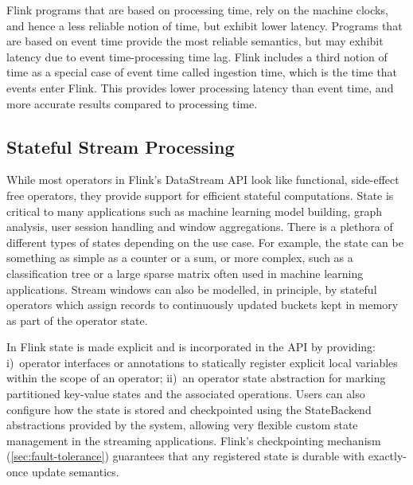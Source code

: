 Flink programs that are based on processing time, rely on the machine clocks, and hence a less reliable notion of time, but exhibit lower latency. Programs that are based on event time provide the most reliable semantics, but may exhibit latency due to event time-processing time lag. Flink includes a third notion of time as a special case of event time called ingestion time, which is the time that events enter Flink. This provides  lower processing latency than event time, and more accurate results compared to processing time.


\subsection{Stateful Stream Processing}
While most operators in Flink’s DataStream API look like functional, side-effect free operators, they provide support for efficient stateful computations. State is critical to many applications such as machine learning model building, graph analysis, user session handling and window aggregations. There is a plethora of different types of states depending on the use case. For example, the state can be something as simple as a counter or a sum, or more complex, such as a classification tree or a large sparse matrix often used in machine learning applications. Stream windows can also be modelled, in principle, by stateful operators which assign records to continuously updated buckets kept in memory as part of the operator state. 

Ιn Flink state is made explicit and is incorporated in the API by providing: i)~operator interfaces or annotations to statically register explicit local variables within the scope of an operator;  ii)~an operator state abstraction for marking partitioned key-value states and the associated operations. Users can also configure how the state is stored and checkpointed using the StateBackend abstractions provided by the system, allowing very flexible custom state management in the streaming applications. Flink’s checkpointing mechanism (\autoref{sec:fault-tolerance}) guarantees that any registered state is durable with exactly-once update semantics. 
\vspace{-8mm}


 

